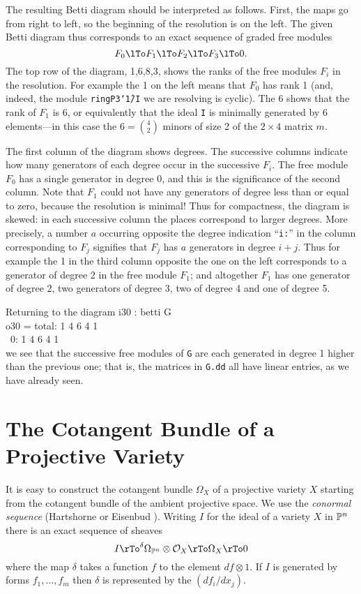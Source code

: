 The resulting Betti diagram should be interpreted as follows.
{}First, the maps go from right to left, so the beginning of the 
resolution is on the left. The given Betti diagram
thus corresponds to an exact sequence of graded free modules
$$
{}F_0\lTo F_1\lTo F_2\lTo F_3\lTo 0.
$$
The top row of the diagram, 1,6,8,3, shows the
ranks of the free modules $F_i$ in the resolution. For example the 1
on the left means that $F_0$ has rank 1 (and,
indeed, the module {\tt ringP3\char`\^1/I} we are resolving is cyclic). 
The 6 shows that the rank of $F_1$ is 6, or equivalently that
the ideal {\tt I} is minimally generated by 6 elements---in this
case the $6 = {\binom 4 2}$ minors of size 2 of the $2\times 4$
matrix $m$. 

The first column of the diagram shows degrees. The successive
columns indicate how many generators of each degree occur in the
successive $F_i$.  The free module $F_0$ has a single generator in
degree 0, and this is the significance of the second column.  Note
that $F_1$ could not have any generators of degree less than or equal
to zero, because the resolution is minimal! Thus for compactness, the
diagram is skewed: in each successive column the places correspond to
larger degrees.  More precisely, a number $a$ occurring opposite the
degree indication ``{\tt i:}'' in the column corresponding to $F_j$ signifies
that $F_j$ has $a$ generators in degree $i+j$.  Thus for example the 1
in the third column opposite the one on the left corresponds to a
generator of degree 2 in the free module $F_1$; and
altogether $F_1$ has one generator of degree 2, two generators of
degree 3, two of degree 4 and one of degree 5.

Returning to the diagram
\beginOutput
i30 : betti G\\
\emptyLine
o30 = total: 1 4 6 4 1\\
\          0: 1 4 6 4 1\\
\endOutput
we see that the successive free modules of {\tt G} are 
each generated in degree 1 higher than the previous one; that
is, the matrices in {\tt G.dd} all have linear entries, as
we have already seen.




\section{The Cotangent Bundle of a Projective Variety}

%
It is easy to construct the cotangent bundle $\Omega_X$ of a projective
variety $X$ starting from the cotangent bundle 
of the ambient
projective space. We use the {\it conormal sequence}
(Hartshorne \cite[Proposition II.8.12]{Hartshorne} or Eisenbud
\cite[Proposition 16.3]{eCA}).
Writing $I$ for the ideal of a variety $X$ in $\P^n$ there is
an exact sequence of sheaves
$$
I \rTo^\delta \Omega_{\P^n}\otimes \cO_X\rTo \Omega_X\rTo 0
$$
where the map $\delta$ takes a function $f$
to the element $df\otimes 1$. If $I$ is generated by 
{}forms $f_1,\dots,f_m$ then $\delta$ is represented
by the  $(df_i/dx_j)$. 


